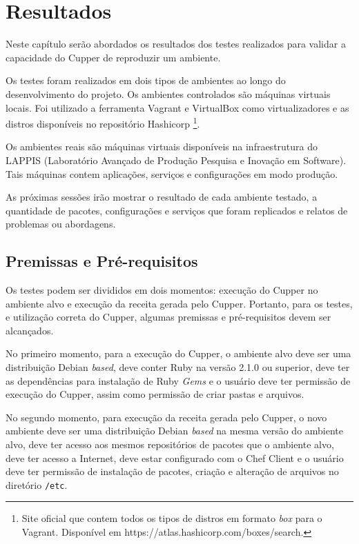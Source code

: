 \chapter{Resultados}
\label{chap:result}

Neste capítulo serão abordados os resultados dos testes realizados
para validar a capacidade do Cupper de reproduzir um ambiente.

Os testes foram realizados em dois tipos de ambientes ao longo do
desenvolvimento do projeto. Os ambientes controlados são máquinas
virtuais locais. Foi utilizado a ferramenta Vagrant e VirtualBox
como virtualizadores e as distros disponíveis no repositório Hashicorp
\footnote{Site oficial que contem todos os tipos de distros em formato \textit{box} para o Vagrant. Disponível em https://atlas.hashicorp.com/boxes/search.}.

Os ambientes reais são máquinas virtuais disponíveis na infraestrutura
do LAPPIS (Laboratório Avançado de Produção Pesquisa e Inovação em Software).
Tais máquinas contem aplicações, serviços e configurações em modo produção.

As próximas sessões irão mostrar o resultado de cada ambiente testado,
a quantidade de pacotes, configurações e serviços que foram replicados
e relatos de problemas ou abordagens.

\section{Premissas e Pré-requisitos}

Os testes podem ser divididos em dois momentos: execução do Cupper no
ambiente alvo e execução da receita gerada pelo Cupper. Portanto,
para os testes, e utilização correta do Cupper, algumas premissas
e pré-requisitos devem ser alcançados.

No primeiro momento, para a execução do Cupper, o ambiente alvo deve
ser uma distribuição Debian \textit{based}, deve conter Ruby na versão
2.1.0 ou superior, deve ter as dependências para instalação
de Ruby \textit{Gems} e o usuário deve ter permissão de execução do Cupper, assim como
permissão de criar pastas e arquivos.

No segundo momento, para execução da receita gerada pelo Cupper, o novo
ambiente deve ser uma distribuição Debian \textit{based} na mesma versão do ambiente
alvo, deve ter acesso aos mesmos repositórios de pacotes que
o ambiente alvo, deve ter acesso a Internet, deve estar configurado com o Chef Client e
o usuário deve ter permissão de instalação de pacotes, criação e alteração de arquivos no
diretório \texttt{/etc}.

